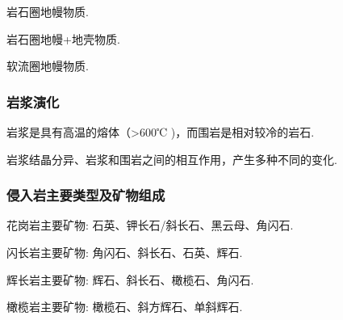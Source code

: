 \documentclass[12pt,a4paper]{article}
\begin{document}
	岩石圈地幔物质.
	
	岩石圈地幔+地壳物质.
	
	软流圈地幔物质.
	
	\subsubsection{岩浆演化}
	
	岩浆是具有高温的熔体（>600℃ )，而围岩是相对较冷的岩石.
	
	岩浆结晶分异、岩浆和围岩之间的相互作用，产生多种不同的变化.
	
	\subsubsection{侵入岩主要类型及矿物组成}
	
	花岗岩主要矿物: 石英、钾长石/斜长石、黑云母、角闪石.
	
	闪长岩主要矿物: 角闪石、斜长石、石英、辉石.
	
	辉长岩主要矿物: 辉石、斜长石、橄榄石、角闪石.
	
	橄榄岩主要矿物: 橄榄石、斜方辉石、单斜辉石.
	
\end{document}
